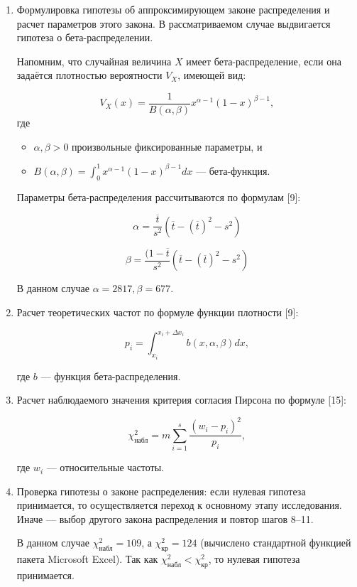\begin{enumerate}
\item Формулировка гипотезы об аппроксимирующем законе распределения и расчет параметров этого закона. В рассматриваемом случае
выдвигается гипотеза о бета-распределении.

Напомним, что случайная величина $X$ имеет бета-распределение, если она задаётся плотностью вероятности $V_X$, имеющей вид:

$$V_X(x) = \frac{1}{B(\alpha, \beta)}x^{\alpha - 1}(1 - x)^{\beta - 1},$$
где
 \begin{itemize}
\item $\alpha, \beta > 0$ произвольные фиксированные параметры, и
\item $B(\alpha, \beta) = \int_{0}^{1}x^{\alpha - 1}(1 - x)^{\beta - 1}dx$ — бета-функция.
\end{itemize}

Параметры бета-распределения рассчитываются по формулам [9]:

$$\alpha = \frac{\overline{t}}{s^2} (\overline{t} - (\overline{t})^2 - s^2)$$

$$\beta = \frac{(1 - \overline{t}}{s^2} (\overline{t} - (\overline{t})^2 - s^2)$$

В данном случае $\alpha = 2817, \beta = 677$.

\item Расчет теоретических частот по формуле функции плотности [9]:

$$p_i = \int_{x_i}^{x_i + \Delta x_i}  b(x, \alpha, \beta) dx,$$

где $b$ — функция бета-распределения.

\item Расчет наблюдаемого значения критерия согласия Пирсона по формуле [15]:

$$\chi ^2_{\text{набл}} = m \sum\limits_{i=1}^s \frac{(w_i - p_i)^2}{p_i},$$

где $w_i$ — относительные частоты.

\item Проверка гипотезы о законе распределения: если нулевая гипотеза
принимается, то осуществляется переход к основному этапу исследования. Иначе —
выбор другого закона распределения и повтор шагов 8–11.

В данном случае $\chi^2_{\text{набл}} = 109$, а $\chi^2_{\text{кр}} = 124$ (вычислено стандартной функцией пакета Microsoft Excel). Так как $\chi^2_{\text{набл}} < \chi^2_{\text{кр}}$, то нулевая гипотеза принимается.

\end{enumerate}

